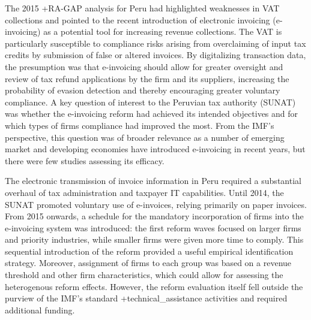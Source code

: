 \documentclass[
]{WileySix}
\begin{document}
The 2015 +RA-GAP\textbar{} analysis for Peru had highlighted weaknesses in VAT collections and pointed to the recent introduction of electronic invoicing (e-invoicing) as a potential tool for increasing revenue collections. The VAT is particularly susceptible to compliance risks arising from overclaiming of input tax credits by submission of false or altered invoices. By digitalizing transaction data, the presumption was that e-invoicing should allow for greater oversight and review of tax refund applications by the firm and its suppliers, increasing the probability of evasion detection and thereby encouraging greater voluntary compliance. A key question of interest to the Peruvian tax authority (SUNAT) was whether the e-invoicing reform had achieved its intended objectives and for which types of firms compliance had improved the most. From the IMF's perspective, this question was of broader relevance as a number of emerging market and developing economies have introduced e-invoicing in recent years, but there were few studies assessing its efficacy.

The electronic transmission of invoice information in Peru required a substantial overhaul of tax administration and taxpayer IT capabilities. Until 2014, the SUNAT promoted voluntary use of e-invoices, relying primarily on paper invoices. From 2015 onwards, a schedule for the mandatory incorporation of firms into the e-invoicing system was introduced: the first reform waves focused on larger firms and priority industries, while smaller firms were given more time to comply. This sequential introduction of the reform provided a useful empirical identification strategy. Moreover, assignment of firms to each group was based on a revenue threshold and other firm characteristics, which could allow for assessing the heterogenous reform effects. However, the reform evaluation itself fell outside the purview of the IMF's standard +technical\_assistance\textbar{} activities and required additional funding.
\end{document}
